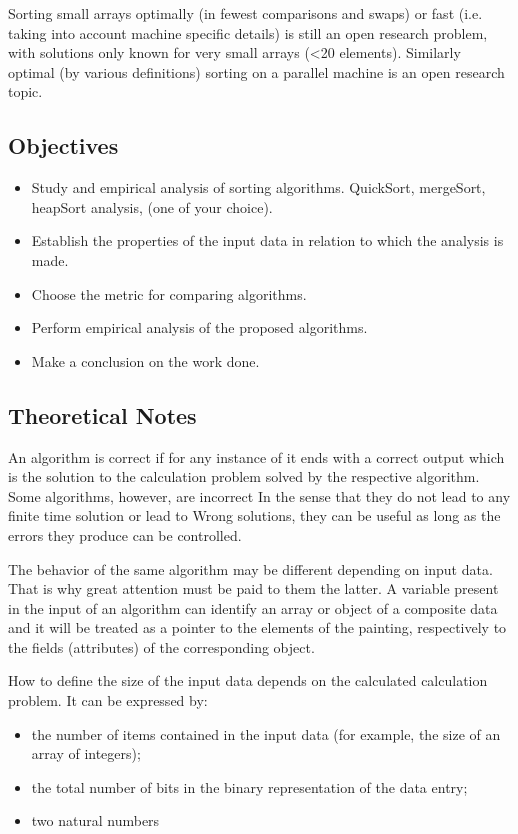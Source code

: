 \documentclass[a4paper, 12pt]{article}
\begin{document}
Sorting small arrays optimally (in fewest comparisons and swaps) or fast 
(i.e. taking into account machine specific details) is still an open research 
problem, with solutions only known for very small arrays (<20 elements). 
Similarly optimal (by various definitions) sorting on a parallel machine is 
an open research topic.

\subsection{Objectives}

\begin{itemize}
  \item Study and empirical analysis of sorting algorithms. QuickSort, mergeSort, heapSort analysis, (one of your choice).
  \item Establish the properties of the input data in relation to which the analysis is made.
  \item Choose the metric for comparing algorithms.
  \item Perform empirical analysis of the proposed algorithms.
  \item Make a conclusion on the work done.
\end{itemize}

\subsection{Theoretical Notes}

An algorithm is correct if for any instance of it
ends with a correct output which is the solution to the calculation problem
solved by the respective algorithm. Some algorithms, however, are incorrect
In the sense that they do not lead to any finite time solution or lead to
Wrong solutions, they can be useful as long as the errors they produce can be
controlled.

The behavior of the same algorithm may be different depending on
input data. That is why great attention must be paid to them
the latter. A variable present in the input of an algorithm can
identify an array or object of a composite data and it will be treated
as a pointer to the elements of the painting, respectively to the fields
(attributes) of the corresponding object.

How to define the size of the input data
depends on the calculated calculation problem. It can be expressed by:

\begin{itemize}
  \item the number of items contained in the input data (for example,
  the size of an array of integers);
  \item the total number of bits in the binary representation of the data
  entry;
  \item two natural numbers
\end{itemize}
\end{document}
